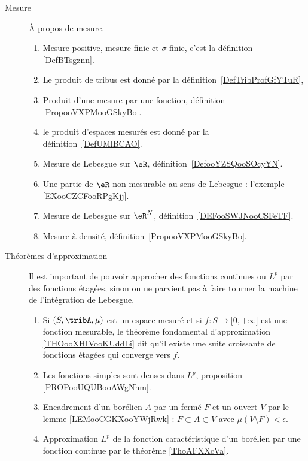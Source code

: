        \label{THEMEooKLVRooEqecQk}
\begin{description}
    \item[Mesure] 
    À propos de mesure.
\begin{enumerate}
    \item
        Mesure positive, mesure finie et \( \sigma\)-finie, c'est la définition \ref{DefBTsgznn}.

    \item Le produit de tribus est donné par la définition~\ref{DefTribProfGfYTuR},     %
    \item
        Produit d'une mesure par une fonction, définition \ref{PropooVXPMooGSkyBo}.
    \item le produit d'espaces mesurés est donné par la définition~\ref{DefUMlBCAO}.     %
        \item
            Mesure de Lebesgue sur \( \eR\), définition~\ref{DefooYZSQooSOcyYN}.
        \item
            Une partie de \( \eR\) non mesurable au sens de Lebesgue : l'exemple \ref{EXooCZCFooRPgKjj}.
        \item
            Mesure de Lebesgue sur \( \eR^N\), définition~\ref{DEFooSWJNooCSFeTF}.
        \item
            Mesure à densité, définition~\ref{PropooVXPMooGSkyBo}.
\end{enumerate}
\item[Théorèmes d'approximation]
    Il est important de pouvoir approcher des fonctions continues ou \( L^p\) par des fonctions étagées, sinon on ne parvient pas à faire tourner la machine de l'intégration de Lebesgue.
    \begin{enumerate}
        \item
            Si \( (S,\tribA, \mu)\) est un espace mesuré et si \( f\colon S\to \mathopen[ 0 , +\infty \mathclose]\) est une fonction mesurable, le théorème fondamental d'approximation \ref{THOooXHIVooKUddLi} dit qu'il existe une suite croissante de fonctions étagées qui converge vers \( f\).
        \item
            Les fonctions simples sont denses dans \( L^p\), proposition \ref{PROPooUQUBooAWgNhm}.
        \item
            Encadrement d'un borélien \( A\) par un fermé \( F\) et un ouvert \( V\) par le lemme \ref{LEMooCGKXooYWjRwk} : \( F\subset A\subset V\) avec \( \mu(V\setminus F)<\epsilon\).
        \item
            Approximation \( L^p\) de la fonction caractéristique d'un borélien par une fonction continue par le théorème \ref{ThoAFXXcVa}.
    \end{enumerate}
\end{description}


